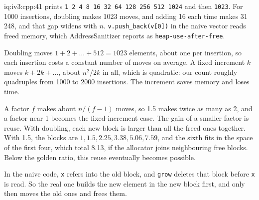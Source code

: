 \begin{solution}{iq:iv3:cpp:41}
 prints \texttt{1 2 4 8 16 32 64 128 256 512 1024} and then \texttt{1023}. For 1000 insertions, doubling makes 1023 moves, and adding 16 each time makes 31\,248, and that gap widens with $n$. \texttt{v.push\_back(v[0])} in the naive vector reads freed memory, which AddressSanitizer reports as \texttt{heap-use-after-free}.

Doubling moves $1 + 2 + \dots + 512 = 1023$ elements, about one per insertion, so each insertion costs a constant number of moves on average. A fixed increment $k$ moves $k + 2k + \dots$, about $n^2 / 2k$ in all, which is quadratic: our count roughly quadruples from 1000 to 2000 insertions. The increment saves memory and loses time.

A factor $f$ makes about $n / (f - 1)$ moves, so 1.5 makes twice as many as 2, and a factor near 1 becomes the fixed-increment case. The gain of a smaller factor is reuse. With doubling, each new block is larger than all the freed ones together. With 1.5, the blocks are $1, 1.5, 2.25, 3.38, 5.06, 7.59$, and the sixth fits in the space of the first four, which total 8.13, if the allocator joins neighbouring free blocks. Below the golden ratio, this reuse eventually becomes possible.

In the naive code, \texttt{x} refers into the old block, and \texttt{grow} deletes that block before \texttt{x} is read. So the real one builds the new element in the new block first, and only then moves the old ones and frees them.

\end{solution}

